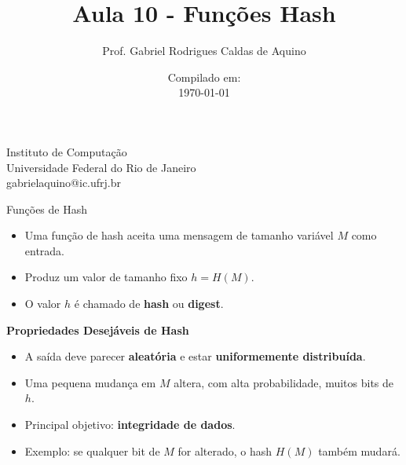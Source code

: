 \title{Aula 10 - Funções Hash}

\author{Prof. Gabriel Rodrigues Caldas de Aquino}

\institute
{
    Instituto de Computação \\
    Universidade Federal do Rio de Janeiro\\
    gabrielaquino@ic.ufrj.br%
}
\date{Compilado em: \\ \today} %




\begin{frame}
    \titlepage
\end{frame}

\begin{frame}{Funções de Hash}
    \begin{itemize}
        \item Uma função de hash aceita uma mensagem de tamanho variável $M$ como entrada.
        \item Produz um valor de tamanho fixo $h = H(M)$.
        \item O valor $h$ é chamado de \textbf{hash} ou \textbf{digest}.
    \end{itemize}
\textbf{Propriedades Desejáveis de Hash}
    \begin{itemize}
        \item A saída deve parecer \textbf{aleatória} e estar \textbf{uniformemente distribuída}.
        \item Uma pequena mudança em $M$ altera, com alta probabilidade, muitos bits de $h$.
        \item Principal objetivo: \textbf{integridade de dados}.
        \item Exemplo: se qualquer bit de $M$ for alterado, o hash $H(M)$ também mudará.
    \end{itemize}
\end{frame}

